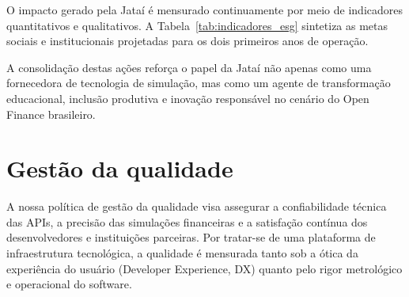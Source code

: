 \documentclass[
  12pt,
  openright,
  oneside,
  a4paper,
  brazilian
]{abntex2}
\begin{document}
O impacto gerado pela Jataí é mensurado continuamente por meio de indicadores quantitativos e qualitativos. A Tabela~\ref{tab:indicadores_esg} sintetiza as metas sociais e institucionais projetadas para os dois primeiros anos de operação.

\begin{table}[htbp]
\centering
\caption{Matriz de indicadores de impacto social e sustentabilidade.}
\label{tab:indicadores_esg}
\end{table}

A consolidação destas ações reforça o papel da Jataí não apenas como uma fornecedora de tecnologia de simulação, mas como um agente de transformação educacional, inclusão produtiva e inovação responsável no cenário do Open Finance brasileiro.

\chapter{Gestão da qualidade}
\label{cap:gestao_qualidade}

A nossa política de gestão da qualidade visa assegurar a confiabilidade técnica das APIs, a precisão das simulações financeiras e a satisfação contínua dos desenvolvedores e instituições parceiras. Por tratar-se de uma plataforma de infraestrutura tecnológica, a qualidade é mensurada tanto sob a ótica da experiência do usuário (Developer Experience, DX) quanto pelo rigor metrológico e operacional do software.
\end{document}
